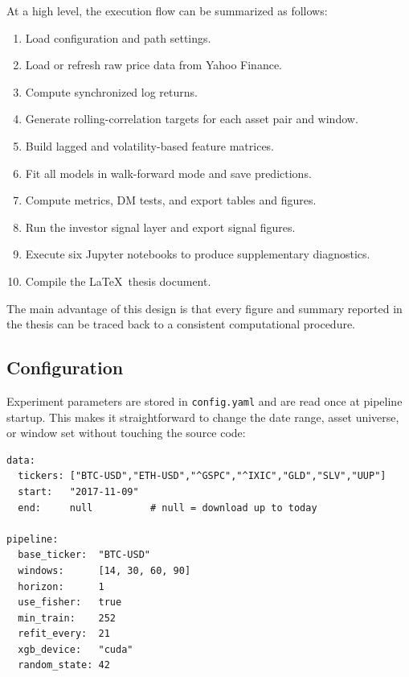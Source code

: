 At a high level, the execution flow can be summarized as follows:

\begin{enumerate}
    \item Load configuration and path settings.
    \item Load or refresh raw price data from Yahoo Finance.
    \item Compute synchronized log returns.
    \item Generate rolling-correlation targets for each asset pair and window.
    \item Build lagged and volatility-based feature matrices.
    \item Fit all models in walk-forward mode and save predictions.
    \item Compute metrics, DM tests, and export tables and figures.
    \item Run the investor signal layer and export signal figures.
    \item Execute six Jupyter notebooks to produce supplementary diagnostics.
    \item Compile the \LaTeX\ thesis document.
\end{enumerate}

The main advantage of this design is that every figure and summary reported in the thesis can be traced back to a consistent computational procedure.

\subsection{Configuration}

Experiment parameters are stored in \texttt{config.yaml} and are read once at pipeline startup. This makes it straightforward to change the date range, asset universe, or window set without touching the source code:

\begin{lstlisting}[language={}, caption={Excerpt from \texttt{config.yaml} showing key experiment parameters.}, label=lst:config]
data:
  tickers: ["BTC-USD","ETH-USD","^GSPC","^IXIC","GLD","SLV","UUP"]
  start:   "2017-11-09"
  end:     null          # null = download up to today

pipeline:
  base_ticker:  "BTC-USD"
  windows:      [14, 30, 60, 90]
  horizon:      1
  use_fisher:   true
  min_train:    252
  refit_every:  21
  xgb_device:   "cuda"
  random_state: 42
\end{lstlisting}

